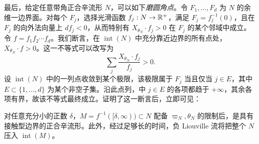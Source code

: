 最后，给定任意带角正合辛流形 $N$，可以如下\emph{磨圆角点}。令 $F_1,\ldots,F_d$ 为 $N$ 的余维一边界面。对每个 $F_j$，选择光滑函数 $f_j:N\to\mathbb R^+$，满足 $F_j=f_j^{-1}(0)$，且在 $F_j$ 的向外法向量上 $df_j<0$，从而特别有
$X_{\theta_N}\cdot f_j>0$ 在 $F_j$ 的某个邻域中成立。令 $f=f_1f_2\cdots f_d$。我们断言，在 $\operatorname{int}(N)$ 中充分靠近边界的所有点处，$X_{\theta_N}\cdot f>0$。这一不等式可以改写为
\begin{equation}\label{eq:7.6}
\sum_j\frac{X_{\theta_N}\cdot f_j}{f_j}>0.
\end{equation}
设 $\operatorname{int}(N)$ 中的一列点收敛到某个极限，该极限属于 $F_j$ 当且仅当 $j\in E$，其中 $E\subset\{1,\ldots,d\}$ 为某个非空子集。沿此点列，中 $j\in E$ 的各项都趋于 $+\infty$，其余各项有界，故该不等式最终成立。证明了这一断言后，立即可见：
\begin{lemma}\label{st:7.6}
对任意充分小的正数 $\delta$，$M=f^{-1}([\delta,\infty))\subset N$ 配备 $\varpi_N,\theta_N$ 的限制后，是具有接触型边界的正合辛流形。此外，经过足够长的时间，负 Liouville 流将把整个 $N$ 压入 $\operatorname{int}(M)$。
\end{lemma}
